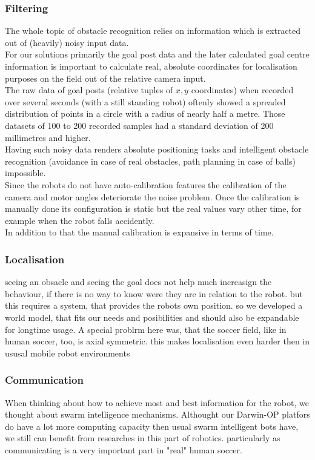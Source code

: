 \documentclass[lnicst,a4paper]{svmultln}
\begin{document}
\subsubsection{Filtering}
The whole topic of obstacle recognition relies on information which is extracted out of (heavily) noisy input data.
\\
For our solutions primarily the goal post data and the later calculated goal centre information is important to calculate real, absolute coordinates for localisation purposes on the field out of the relative camera input.
\\
The raw data of goal posts (relative tuples of $x, y$ coordinates) when recorded over several seconds (with a still standing robot) oftenly showed a spreaded distribution of points in a circle with a radius of nearly half a metre. Those datasets of 100 to 200 recorded samples had a standard deviation of 200 millimetres and higher.
\\
Having such noisy data renders absolute positioning tasks and intelligent obstacle recognition (avoidance in case of real obstacles, path planning in case of balls) impossible.
\\
Since the robots do not have auto-calibration features the calibration of the camera and motor angles deteriorate the noise problem. Once the calibration is manually done its configuration is static but the real values vary other time, for example when the robot falls accidently.
\\
In addition to that the manual calibration is expansive in terms of time.

\subsubsection{Localisation}
seeing an obsacle and seeing the goal does not help much increasign the behaviour, if there is no way to know were they are in relation to the robot. but this requires a system, that provides the robots own position. so we developed a world model, that fits our needs and posibilities and should also be expandable for longtime usage. A special problrm here was, that the soccer field, like in human soccer, too, is axial symmetric. this makes localisation even harder then in ususal mobile robot environments

\subsubsection{Communication}
When thinking about how to achieve most and best information for the robot, we thought about swarm intelligence mechanisms. Althought our Darwin-OP platfors do have a lot more computing capacity then usual swarm intelligent bots have, we still can benefit from researches in this part of robotics. particularly as communicating is a very important part in "real" human soccer.
\end{document}
